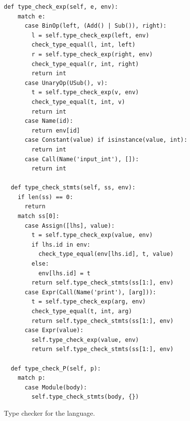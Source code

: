 \documentclass[7x10]{TimesAPriori_MIT}%
\numberwithin{theorem}{chapter}
\numberwithin{definition}{chapter}
\numberwithin{equation}{chapter}
\begin{document}
\begin{figure}[tbp]
\begin{tcolorbox}[colback=white]
{\begin{lstlisting}[escapechar=`]
  def type_check_exp(self, e, env):
    match e:
      case BinOp(left, (Add() | Sub()), right):
        l = self.type_check_exp(left, env)
        check_type_equal(l, int, left)
        r = self.type_check_exp(right, env)
        check_type_equal(r, int, right)
        return int
      case UnaryOp(USub(), v):
        t = self.type_check_exp(v, env)
        check_type_equal(t, int, v)
        return int
      case Name(id):
        return env[id]
      case Constant(value) if isinstance(value, int):
        return int
      case Call(Name('input_int'), []):
        return int

  def type_check_stmts(self, ss, env):
    if len(ss) == 0:
      return
    match ss[0]:
      case Assign([lhs], value):
        t = self.type_check_exp(value, env)
        if lhs.id in env:
          check_type_equal(env[lhs.id], t, value)
        else:
          env[lhs.id] = t
        return self.type_check_stmts(ss[1:], env)
      case Expr(Call(Name('print'), [arg])):
        t = self.type_check_exp(arg, env)
        check_type_equal(t, int, arg)
        return self.type_check_stmts(ss[1:], env)
      case Expr(value):
        self.type_check_exp(value, env)
        return self.type_check_stmts(ss[1:], env)

  def type_check_P(self, p):
    match p:
      case Module(body):
        self.type_check_stmts(body, {})
\end{lstlisting}
\fi}
\end{tcolorbox}
\caption{Type checker for the \LangVar{} language.}
\label{fig:type-check-Lvar}
\end{figure}
\end{document}
